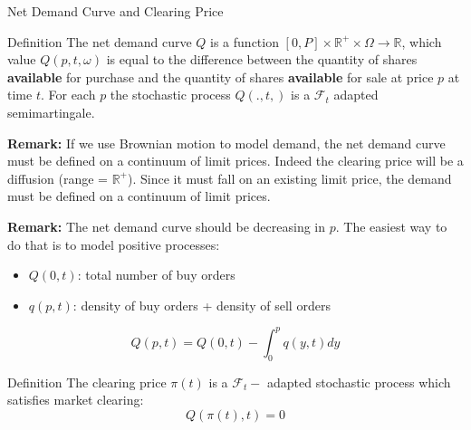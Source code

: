 \documentclass{beamer}
\begin{document}
\begin{frame}[shrink=38]{{\color{cyan}Net Demand Curve and Clearing Price}}
\bigskip
\begin{block}{Definition}
The net demand curve $Q$ is a function $[0,P]\times \mathbb{R}^{+}\times \Omega \mathbb{\rightarrow R}$, which value $Q(p,t,\omega )$ is equal to the difference between the quantity of shares \textbf{available} for purchase and the quantity of shares \textbf{available} for sale at price $p$ at time $t$. For each $p$ the stochastic process $Q(.,t,)$ is a $\mathcal{F}_{t}$ adapted semimartingale.
\end{block}

{\color{magenta}\textbf{Remark:}} If we use Brownian motion to model demand, the net demand curve must be defined on a continuum of limit prices. Indeed the clearing price will be a diffusion (range = $\mathbb{R}^{+}$). Since it must fall on an existing limit price, the demand must be defined on a continuum of limit prices.

\vspace{5pt}
{\color{magenta}\textbf{Remark:}} The net demand curve should be decreasing in $p$. The easiest way to do that is to model positive processes:
\begin{itemize}
\item $Q(0,t)$: total number of buy orders
\item $q(p,t)$: density of buy orders + density of sell orders
\end{itemize}
\begin{equation*}
Q(p,t)=Q(0,t)-\int_{0}^{p}q(y,t)dy
\end{equation*}

\begin{block}{Definition}
The clearing price $\pi (t)$ is a $\mathcal{F}_{t}-$ adapted stochastic process which satisfies market clearing:
\vspace{-8pt}
\begin{equation*}
Q(\pi (t),t)=0
\end{equation*}
\end{block}

\end{frame}
\end{document}
